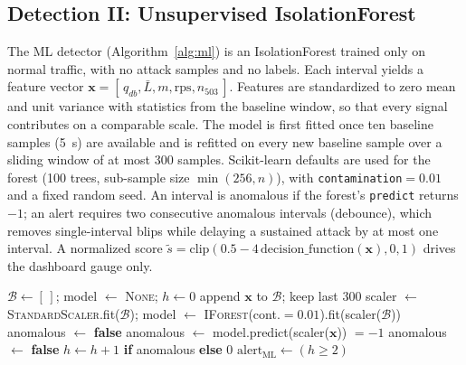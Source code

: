 \subsection{Detection II: Unsupervised IsolationForest}
\label{sec:design-ml}
The ML detector (Algorithm~\ref{alg:ml}) is an IsolationForest \cite{liu2008} trained
only on normal traffic, with no attack samples and no labels. Each interval yields a
feature vector $\mathbf{x}=[\,q_{db}, \bar{L}, m, \text{rps}, n_{503}\,]$. Features
are standardized to zero mean and unit variance with statistics from the baseline
window, so that every signal contributes on a comparable scale. The model is first
fitted once ten baseline samples (5~s) are available and is refitted on every new
baseline sample over a sliding window of at most 300 samples. Scikit-learn defaults
are used for the forest (100 trees, sub-sample size $\min(256,n)$), with
\texttt{contamination}$=0.01$ and a fixed random seed. An interval is anomalous if the
forest's \texttt{predict} returns $-1$; an alert requires two consecutive anomalous
intervals (debounce), which removes single-interval blips while delaying a sustained
attack by at most one interval. A normalized score
$\tilde s = \mathrm{clip}(0.5 - 4\,\mathrm{decision\_function}(\mathbf{x}), 0, 1)$ drives
the dashboard gauge only.

\begin{algorithm}[t]
\caption{Online IsolationForest detector}
\label{alg:ml}
\begin{algorithmic}[1]
\State $\mathcal{B} \gets [\,]$; model $\gets$ \textsc{None}; $h \gets 0$
    \State append $\mathbf{x}$ to $\mathcal{B}$; keep last 300
     \State scaler $\gets$ \textsc{StandardScaler}.fit($\mathcal{B}$); model $\gets$ \textsc{IForest}(cont.$=0.01$).fit(scaler($\mathcal{B}$)) \EndIf
  \EndIf
   \State anomalous $\gets$ \textbf{false}
  \Else \State anomalous $\gets$ model.predict(scaler($\mathbf{x}$)) $= -1$ \EndIf
   \State anomalous $\gets$ \textbf{false} \EndIf
  \State $h \gets h+1$ \textbf{if} anomalous \textbf{else} $0$
  \State $\mathrm{alert}_{\mathrm{ML}} \gets (h \ge 2)$
\EndFor
\end{algorithmic}
\end{algorithm}

